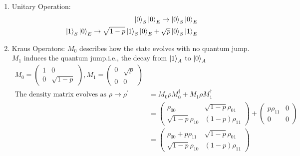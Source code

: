 \begin{enumerate}
\begin{enumerate}
        \item {Unitary Operation:}
        \begin{equation}
        \begin{aligned}
            \ket{0}_S\ket{0}_E \rightarrow \ket{0}_S\ket{0}_E \\
            \ket{1}_S\ket{0}_E \rightarrow \sqrt{1-p}\ket{1}_S\ket{0}_E + \sqrt{p}\ket{0}_S\ket{1}_E
        \end{aligned}
        \end{equation}
        \item {Kraus Operators:}
        $M_0$ describes how the state evolves with no quantum jump. $M_1$ induces the quantum jump.i.e., the decay from $\ket{1}_A$ to $\ket{0}_A$
        \begin{equation}
        \begin{aligned}
            M_0 = \begin{pmatrix}
1 & 0\\
0 & \sqrt{1-p}
\end{pmatrix}, M_1 = \begin{pmatrix}
0 & \sqrt{p}\\
0 & 0
\end{pmatrix} \\
\text{The density matrix evolves as } \rho \rightarrow \rho^{'} &= M_0\rho M_0^{\dagger} + M_1\rho M_1^{\dagger} \\
& = \begin{pmatrix}
\rho_{00} & \sqrt{1-p}\rho_{01}\\
\sqrt{1-p}\rho_{10} & (1-p)\rho_{11}
\end{pmatrix} + \begin{pmatrix}
p\rho_{11} & 0 \\
0 & 0
\end{pmatrix} \\
& = \begin{pmatrix}
\rho_{00} + p\rho_{11} & \sqrt{1-p}\rho_{01}\\
\sqrt{1-p}\rho_{10} & (1-p)\rho_{11}
\end{pmatrix}
        \end{aligned}
        \end{equation}
    \end{enumerate}
\end{enumerate}
